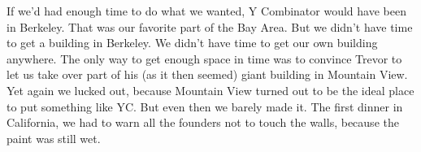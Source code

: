                   
                    If we'd had enough time to do what we wanted, Y Combinator
                    would have been in Berkeley. That was our favorite part of
                    the Bay Area. But we didn't have time to get a building in
                    Berkeley. We didn't have time to get our own building
                    anywhere. The only way to get enough space in time was to
                    convince Trevor to let us take over part of his (as it then
                    seemed) giant building in Mountain View. Yet again we lucked
                    out, because Mountain View turned out to be the ideal place
                    to put something like YC. But even then we barely made it.
                    The first dinner in California, we had to warn all the
                    founders not to touch the walls, because the paint was still
                    wet.



              
            
          
            
              
                


                  
              
            
          
